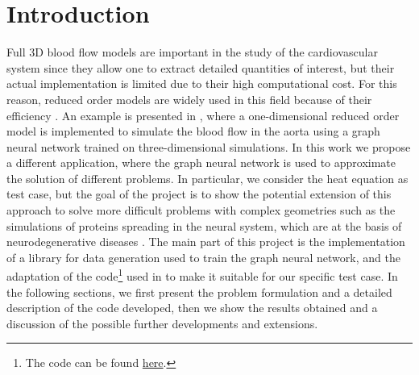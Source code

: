 \documentclass[11pt,a4paper]{article}
\begin{document}




\section{Introduction}
Full 3D blood flow models are important in the study of the cardiovascular system since they allow one to extract detailed quantities of interest, but their actual implementation is limited due to their high computational cost. For this reason, reduced order models are widely used in this field because of their efficiency \cite{Formaggia_Quarteroni_Veneziani_2009}. An example is presented in \cite{Luca}, where a one-dimensional reduced order model is implemented to simulate the blood flow in the aorta using a graph neural network trained on three-dimensional simulations. In this work we propose a different application, where the graph neural network is used to approximate the solution of different problems. In particular, we consider the heat equation as test case, but the goal of the project is to show the potential extension of this approach to solve more difficult problems with complex geometries such as the simulations of proteins spreading in the neural system, which are at the basis of neurodegenerative diseases \cite{MattiaCorti}. The main part of this project is the implementation of a library for data generation used to train the graph neural network, and the adaptation of the code\footnote{The code can be found \href{https://github.com/StanfordCBCL/gROM}{here}.} used in \cite{Luca} to make it suitable for our specific test case. In the following sections, we first present the problem formulation and a detailed description of the code developed, then we show the results obtained and a discussion of the possible further developments and extensions.

\end{document}
